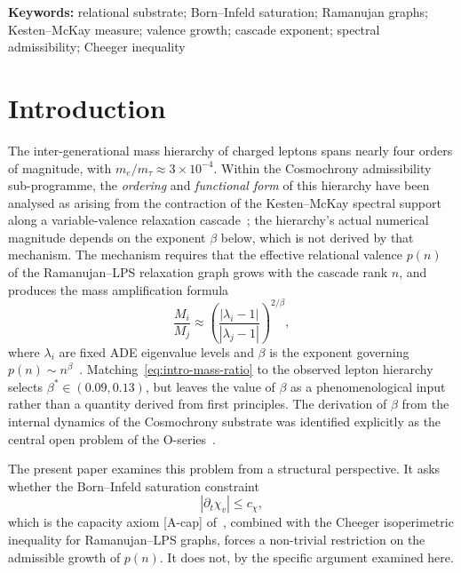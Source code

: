 \documentclass[11pt,a4paper]{article}
\theoremstyle{definition}
\theoremstyle{remark}
\begin{document}
  \noindent\textbf{Keywords:} relational substrate; Born--Infeld saturation; Ramanujan graphs;
  Kesten--McKay measure; valence growth; cascade exponent; spectral admissibility;
  Cheeger inequality

  \clearpage
  \tableofcontents

  \clearpage
  \section{Introduction}
    \label{sec:introduction}

    The inter-generational mass hierarchy of charged leptons spans nearly four orders of
    magnitude, with $m_e / m_\tau \approx 3 \times 10^{-4}$.
    Within the Cosmochrony admissibility sub-programme, the \emph{ordering} and
    \emph{functional form} of this hierarchy have been analysed as arising from the
    contraction of the Kesten--McKay spectral support along a variable-valence relaxation
    cascade~\cite{Beau2026a6, Beau2026a7}; the hierarchy's actual numerical magnitude depends
    on the exponent $\beta$ below, which is not derived by that mechanism.
    The mechanism requires that the effective relational valence $p(n)$ of the Ramanujan--LPS
    relaxation graph grows with the cascade rank $n$, and produces the mass amplification
    formula
    \begin{equation}
      \label{eq:intro-mass-ratio}
      \frac{M_i}{M_j}
      \approx
      \left(\frac{|\lambda_i - 1|}{|\lambda_j - 1|}\right)^{2/\beta},
    \end{equation}
    where $\lambda_i$ are fixed ADE eigenvalue levels and $\beta$ is the exponent governing
    $p(n) \sim n^\beta$~\cite{Beau2026a7}.
    Matching~\eqref{eq:intro-mass-ratio} to the observed lepton hierarchy selects
    $\beta^* \in (0.09, 0.13)$, but leaves the value of $\beta$ as a phenomenological input
    rather than a quantity derived from first principles.
    The derivation of $\beta$ from the internal dynamics of the Cosmochrony substrate was
    identified explicitly as the central open problem of the O-series~\cite{Beau2026a7}.

    The present paper examines this problem from a structural perspective.
    It asks whether the Born--Infeld saturation constraint
    \begin{equation}
      \label{eq:intro-bi}
      |\partial_t \chi_v| \leq c_\chi,
    \end{equation}
    which is the capacity axiom [A-cap] of~\cite{Beau2026c}, combined with the Cheeger
    isoperimetric inequality for Ramanujan--LPS graphs, forces a non-trivial restriction on
    the admissible growth of $p(n)$.
    It does not, by the specific argument examined here.
\end{document}

